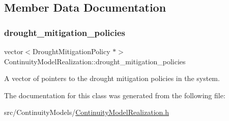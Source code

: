 \subsection{Member Data Documentation}
\mbox{\label{classContinuityModelRealization_a757dcf1de115c674fd5adcb040c5f277}} 
\subsubsection{\texorpdfstring{drought\+\_\+mitigation\+\_\+policies}{drought\_mitigation\_policies}}
{\footnotesize\ttfamily vector$<$Drought\+Mitigation\+Policy $\ast$$>$ Continuity\+Model\+Realization\+::drought\+\_\+mitigation\+\_\+policies\hspace{0.3cm}{\ttfamily [private]}}



A vector of pointers to the drought mitigation policies in the system. 



The documentation for this class was generated from the following file\+:\begin{DoxyCompactItemize}
\item 
src/\+Continuity\+Models/\mbox{\hyperlink{ContinuityModelRealization_8h}{Continuity\+Model\+Realization.\+h}}\end{DoxyCompactItemize}
